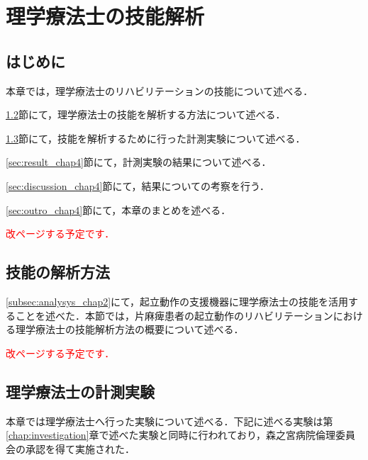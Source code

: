 \chapter{理学療法士の技能解析}
\label{chap:analysys}
\minitoc

\thispagestyle{empty}

\newpage
\section{はじめに}
\label{sec:intro_chap4}

本章では，理学療法士のリハビリテーションの技能について述べる．

\ref{sec:method_chap4}節にて，理学療法士の技能を解析する方法について述べる．

\ref{sec:experiment_chap4}節にて，技能を解析するために行った計測実験について述べる．

\ref{sec:result_chap4}節にて，計測実験の結果について述べる．

\ref{sec:discussion_chap4}節にて，結果についての考察を行う．

\ref{sec:outro_chap4}節にて，本章のまとめを述べる．

\textcolor{red}{改ページする予定です．}
\section{技能の解析方法}
\label{sec:method_chap4}
\ref{subsec:analysys_chap2}にて，起立動作の支援機器に理学療法士の技能を活用することを述べた．本節では，片麻痺患者の起立動作のリハビリテーションにおける理学療法士の技能解析方法の概要について述べる．

\textcolor{red}{改ページする予定です．}
\section{理学療法士の計測実験}
\label{sec:experiment_chap4}
本章では理学療法士へ行った実験について述べる．下記に述べる実験は第\ref{chap:investigation}章で述べた実験と同時に行われており，森之宮病院倫理委員会の承認を得て実施された．

